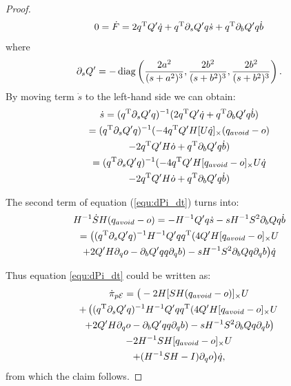 \documentclass[journal]{IEEEtran}  %
\begin{document}
\begin{proof}
    \begin{equation}
      0=\dot F =  2q^\mathrm{T} Q' \dot q + q^\mathrm{T} \partial_s Q' q \dot s + q^\mathrm{T} \partial_bQ' q \dot b
    \end{equation}
    where
    \begin{equation}
      \partial_s Q'= -\operatorname{diag}\left(\frac{2a^2}{(s+a^2)^3},\frac{2b^2}{(s+b^2)^3},\frac{2b^2}{(s+b^2)^3}\right).
    \end{equation}
    By moving term $\dot s$ to the left-hand side we can obtain:
    \begin{multline}\label{equ:s_dot}
      \dot s =  (q^\mathrm{T} \partial_s Q' q)^{-1} (2q^\mathrm{T} Q' \dot q + q^\mathrm{T} \partial_b Q' q \dot b)\\
      =  (q^\mathrm{T} \partial_s Q' q)^{-1} (-4q^\mathrm{T} Q' H[U\dot q]_\times (q_{avoid} - o) \\
      -2q^\mathrm{T} Q'H\dot o + q^\mathrm{T} \partial_b Q' q \dot b)\\
      =  (q^\mathrm{T} \partial_s Q' q)^{-1} (-4q^\mathrm{T} Q' H[q_{avoid} - o]_\times U\dot q \\
      -2q^\mathrm{T} Q'H\dot o + q^\mathrm{T} \partial_b Q' q \dot b)
    \end{multline}

    The second term of equation (\ref{equ:dPi_dt}) turns into:
    \begin{multline}
      H^{-1}\dot S H (q_{avoid} - o)
      = - H^{-1} Q' q \dot s - s H^{-1} S^2 \partial_b Q q \dot b\\
      =   \big( (q^\mathrm{T} \partial_s Q' q)^{-1} H^{-1} Q' q q^\mathrm{T}  (4Q' H[q_{avoid} - o]_\times U  \\
      + 2Q' H\partial_q o - \partial_b Q' q q \partial_q b) -  s H^{-1} S^2 \partial_b Q q \partial_q b\big) \dot q\\
    \end{multline}

    Thus equation \eqref{equ:dPi_dt} could be written as:
    \begin{multline}
      \dot \pi_{p\mathcal{E}} = \big(-2 H [ SH(q_{avoid}-o)]_{\times}U   \\
      + \left( (q^\mathrm{T} \partial_s Q' q)^{-1} H^{-1} Q' q q^\mathrm{T}  (4Q' H[q_{avoid} - o]_\times U \right. \\
      \left.+ 2Q' H\partial_q o - \partial_b Q' q q \partial_q b) -  s H^{-1} S^2 \partial_b Q q \partial_q b\right) \\
      -2H^{-1} S H[q_{avoid}-o]_{\times} U  \\
      + (H^{-1}SH -I)\partial_q o \big) \dot q,
    \end{multline}
    from which the claim follows.
  \end{proof}
  
\end{document}
